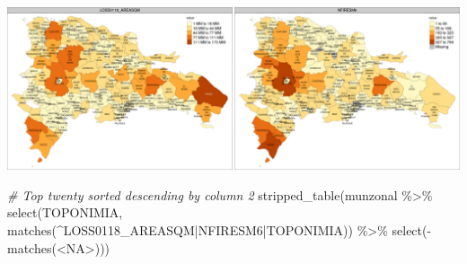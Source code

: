 \documentclass[10pt,landscape,a3paper]{article}
\newenvironment{Shaded}{\begin{snugshade}}{\end{snugshade}}
\newcommand{\CommentTok}[1]{\textcolor[rgb]{0.56,0.35,0.01}{\textit{#1}}}
\newcommand{\FunctionTok}[1]{\textcolor[rgb]{0.00,0.00,0.00}{#1}}
\newcommand{\NormalTok}[1]{#1}
\newcommand{\SpecialCharTok}[1]{\textcolor[rgb]{0.00,0.00,0.00}{#1}}
\newcommand{\StringTok}[1]{\textcolor[rgb]{0.31,0.60,0.02}{#1}}
\begin{document}
\begin{center}\includegraphics{img/zonal-mun-7} \end{center}

\begin{Shaded}
\begin{Highlighting}[]
\CommentTok{\# Top twenty sorted descending by column 2}
\FunctionTok{stripped\_table}\NormalTok{(munzonal }\SpecialCharTok{\%\textgreater{}\%} \FunctionTok{select}\NormalTok{(TOPONIMIA, }\FunctionTok{matches}\NormalTok{(}\StringTok{\textquotesingle{}\^{}LOSS0118\_AREASQM|NFIRESM6|TOPONIMIA\textquotesingle{}}\NormalTok{)) }\SpecialCharTok{\%\textgreater{}\%} \FunctionTok{select}\NormalTok{(}\SpecialCharTok{{-}}\FunctionTok{matches}\NormalTok{(}\StringTok{\textquotesingle{}\textless{}NA\textgreater{}\textquotesingle{}}\NormalTok{)))}
\end{Highlighting}
\end{Shaded}
\end{document}
